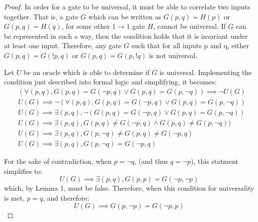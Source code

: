 \documentclass[12pt]{article}
\begin{document}
\begin{proof}
	In order for a gate to be universal, it must be able to correlate two inputs together. That is, a gate $G$ which can be written as $G(p, q) = H(p)$ or $G(p, q) = H(q)$, for some other $1 \to 1$ gate $H$, cannot be universal. If $G$ can be represented in such a way, then the condition holds that it is invariant under at least one input. Therefore, any gate $G$ such that for all inputs p and q, either $G(p, q) = G(!p, q)$ or $G(p, q) = G(p, !q)$ is not universal.

    Let $U$ be an oracle which is able to determine if $G$ is universal. Implementing the condition just described into formal logic and simplifying, it becomes:
    \begin{align}
        &(\forall (p, q), G(p, q) = G(\neg p, q) \lor G(p, q) = G(p, \neg q)) \implies \neg U(G) \\
        &U(G) \implies \neg (\forall (p, q), G(p, q) = G(\neg p, q) \lor G(p, q) = G(p, \neg q)) \\
        &U(G) \implies \exists (p, q), \neg (G(p, q) = G(\neg p, q) \lor G(p, q) = G(p, \neg q)) \\
        &U(G) \implies \exists (p, q), G(p, q) \ne G(\neg p, q) \land G(p, q) \ne G(p, \neg q)) \\
        &U(G) \implies \exists (p, q), G(p, \neg q) \ne G(p, q) \ne G(\neg p, q) \\
        &U(G) \implies \exists (p, q), G(p, \neg q) = G(\neg p, q)
    \end{align}

    For the sake of contradiction, when $p = \neg q$, (and thus $q = \neg p$), this statment simplifies to:
    $$U(G) \implies \exists (p, q), G(p, p) = G(\neg p, \neg p)$$
    which, by Lemma 1, must be false. Therefore, when this condition for universality is met, $p = q$, and therefore:
    $$U(G) \implies G(p, \neg p) = G(\neg p, p)$$
\end{proof}
\end{document}
